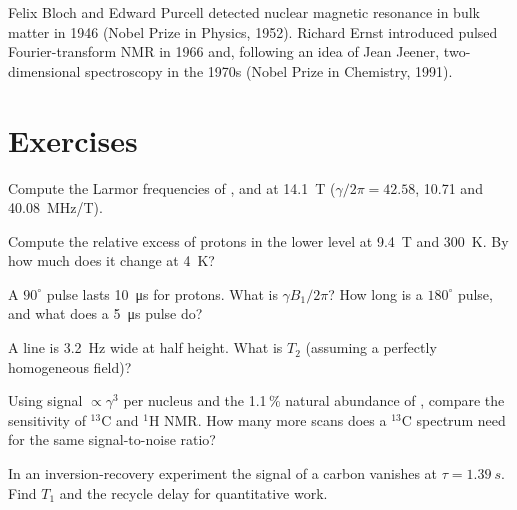 \begin{history}
Felix Bloch and Edward Purcell detected nuclear magnetic resonance in bulk
matter in 1946 (Nobel Prize in Physics, 1952). Richard Ernst introduced pulsed
Fourier-transform NMR in 1966 and, following an idea of Jean Jeener, two-
dimensional spectroscopy in the 1970s (Nobel Prize in Chemistry, 1991).
\end{history}

\section{Exercises}

\begin{exercise}[$\star$]\label{exo:b3:advanced-nmr:1}
Compute the Larmor frequencies of ,  and  at \qty{14.1}{T}
($\gamma/2\pi = 42.58$, 10.71 and \qty{40.08}{MHz/T}).
\end{exercise}

\begin{exercise}[$\star$]\label{exo:b3:advanced-nmr:2}
Compute the relative excess of protons in the lower level at \qty{9.4}{T} and
\qty{300}{K}. By how much does it change at \qty{4}{K}?
\end{exercise}

\begin{exercise}[$\star$]\label{exo:b3:advanced-nmr:3}
A $90^\circ$ pulse lasts \qty{10}{\micro s} for protons. What is $\gamma B_1/2\pi$? How long is a
$180^\circ$ pulse, and what does a \qty{5}{\micro s} pulse do?
\end{exercise}

\begin{exercise}[$\star$]\label{exo:b3:advanced-nmr:4}
A line is \qty{3.2}{Hz} wide at half height. What is $T_2$ (assuming a perfectly
homogeneous field)?
\end{exercise}

\begin{exercise}[$\star\star$]\label{exo:b3:advanced-nmr:5}
Using signal $\propto\gamma^3$ per nucleus and the 1.1\,\% natural abundance of
, compare the sensitivity of ${}^{13}$C and ${}^1$H NMR. How many more scans
does a ${}^{13}$C spectrum need for the same signal-to-noise ratio?
\end{exercise}

\begin{exercise}[$\star\star$]\label{exo:b3:advanced-nmr:6}
In an inversion-recovery experiment the signal of a carbon vanishes at
$\tau = \qty{1.39}{s}$. Find $T_1$ and the recycle delay for quantitative work.
\end{exercise}

